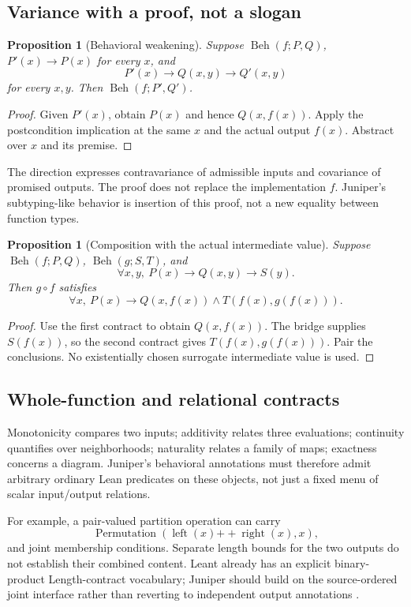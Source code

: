 \documentclass[11pt,a4paper]{article}
\newcommand{\Beh}{\operatorname{Beh}}\newcommand{\Req}{\operatorname{Req}}
\newtheorem{proposition}[theorem]{Proposition}
\theoremstyle{definition}\newtheorem{definition}[theorem]{Definition}
\theoremstyle{remark}\newtheorem{remark}[theorem]{Remark}
\begin{document}
\subsection{Variance with a proof, not a slogan}
\begin{proposition}[Behavioral weakening]
Suppose $\Beh(f;P,Q)$, $P'(x)\to P(x)$ for every $x$, and
\[
 P'(x)\to Q(x,y)\to Q'(x,y)
\]
for every $x,y$. Then $\Beh(f;P',Q')$.
\end{proposition}
\begin{proof}
Given $P'(x)$, obtain $P(x)$ and hence $Q(x,f(x))$. Apply the postcondition implication at the same $x$ and the actual output $f(x)$. Abstract over $x$ and its premise.
\end{proof}
The direction expresses contravariance of admissible inputs and covariance of promised outputs. The proof does not replace the implementation $f$. Juniper's subtyping-like behavior is insertion of this proof, not a new equality between function types.

\begin{proposition}[Composition with the actual intermediate value]
Suppose $\Beh(f;P,Q)$, $\Beh(g;S,T)$, and
\[
 \forall x,y,\ P(x)\to Q(x,y)\to S(y).
\]
Then $g\circ f$ satisfies
\[
 \forall x,\ P(x)\to
 Q(x,f(x))\land T(f(x),g(f(x))).
\]
\end{proposition}
\begin{proof}
Use the first contract to obtain $Q(x,f(x))$. The bridge supplies $S(f(x))$, so the second contract gives $T(f(x),g(f(x)))$. Pair the conclusions. No existentially chosen surrogate intermediate value is used.
\end{proof}

\subsection{Whole-function and relational contracts}
Monotonicity compares two inputs; additivity relates three evaluations; continuity quantifies over neighborhoods; naturality relates a family of maps; exactness concerns a diagram. Juniper's behavioral annotations must therefore admit arbitrary ordinary Lean predicates on these objects, not just a fixed menu of scalar input/output relations.

For example, a pair-valued partition operation can carry
\[
 \operatorname{Permutation}(\operatorname{left}(x){+\!+}\operatorname{right}(x),x),
\]
and joint membership conditions. Separate length bounds for the two outputs do not establish their combined content. Leant already has an explicit binary-product Length-contract vocabulary; Juniper should build on the source-ordered joint interface rather than reverting to independent output annotations \cite{lengthContract}.
\end{document}
